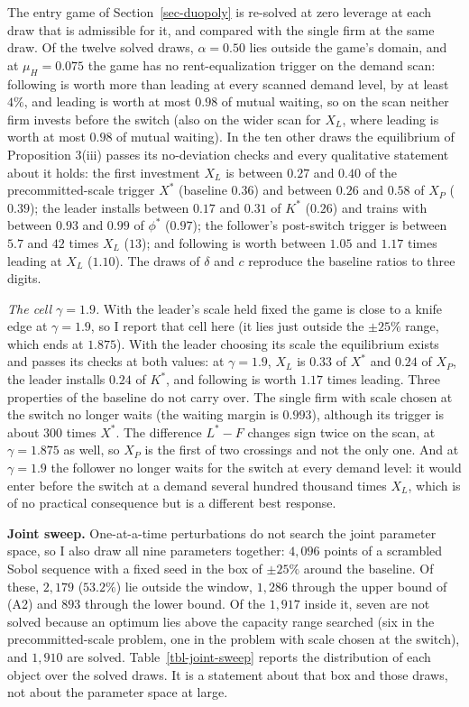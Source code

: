 \documentclass[
  11pt,
  letterpaper,
]{scrartcl}
\begin{document}
The entry game of Section~\ref{sec-duopoly} is re-solved at zero
leverage at each draw that is admissible for it, and compared with the
single firm at the same draw. Of the twelve solved draws,
\(\alpha = 0.50\) lies outside the game's domain, and at
\(\mu_H = 0.075\) the game has no rent-equalization trigger on the
demand scan: following is worth more than leading at every scanned
demand level, by at least \(4\%\), and leading is worth at most \(0.98\)
of mutual waiting, so on the scan neither firm invests before the switch
(also on the wider scan for \(X_L\), where leading is worth at most
\(0.98\) of mutual waiting). In the ten other draws the equilibrium of
Proposition 3(iii) passes its no-deviation checks and every qualitative
statement about it holds: the first investment \(X_L\) is between
\(0.27\) and \(0.40\) of the precommitted-scale trigger \(X^*\)
(baseline \(0.36\)) and between \(0.26\) and \(0.58\) of \(X_P\)
(\(0.39\)); the leader installs between \(0.17\) and \(0.31\) of \(K^*\)
(\(0.26\)) and trains with between \(0.93\) and \(0.99\) of \(\phi^*\)
(\(0.97\)); the follower's post-switch trigger is between \(5.7\) and
\(42\) times \(X_L\) (\(13\)); and following is worth between \(1.05\)
and \(1.17\) times leading at \(X_L\) (\(1.10\)). The draws of
\(\delta\) and \(c\) reproduce the baseline ratios to three digits.

\emph{The cell \(\gamma = 1.9\).} With the leader's scale held fixed the
game is close to a knife edge at \(\gamma = 1.9\), so I report that cell
here (it lies just outside the \(\pm 25\%\) range, which ends at
\(1.875\)). With the leader choosing its scale the equilibrium exists
and passes its checks at both values: at \(\gamma = 1.9\), \(X_L\) is
\(0.33\) of \(X^*\) and \(0.24\) of \(X_P\), the leader installs
\(0.24\) of \(K^*\), and following is worth \(1.17\) times leading.
Three properties of the baseline do not carry over. The single firm with
scale chosen at the switch no longer waits (the waiting margin is
\(0.993\)), although its trigger is about \(300\) times \(X^*\). The
difference \(L^* - F\) changes sign twice on the scan, at
\(\gamma = 1.875\) as well, so \(X_P\) is the first of two crossings and
not the only one. And at \(\gamma = 1.9\) the follower no longer waits
for the switch at every demand level: it would enter before the switch
at a demand several hundred thousand times \(X_L\), which is of no
practical consequence but is a different best response.

\textbf{Joint sweep.} One-at-a-time perturbations do not search the
joint parameter space, so I also draw all nine parameters together:
\(4{,}096\) points of a scrambled Sobol sequence with a fixed seed in
the box of \(\pm 25\%\) around the baseline. Of these, \(2{,}179\)
(\(53.2\%\)) lie outside the window, \(1{,}286\) through the upper bound
of (A2) and \(893\) through the lower bound. Of the \(1{,}917\) inside
it, seven are not solved because an optimum lies above the capacity
range searched (six in the precommitted-scale problem, one in the
problem with scale chosen at the switch), and \(1{,}910\) are solved.
Table~\ref{tbl-joint-sweep} reports the distribution of each object over
the solved draws. It is a statement about that box and those draws, not
about the parameter space at large.
\end{document}
